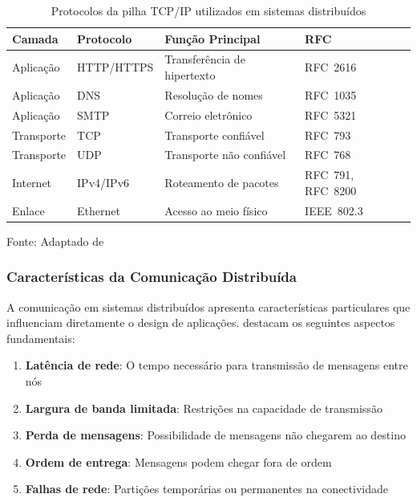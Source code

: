 \begin{table}[H]
\centering
\caption{Protocolos da pilha TCP/IP utilizados em sistemas distribuídos}
\begin{tabular}{|l|l|l|l|}
\hline
\textbf{Camada} & \textbf{Protocolo} & \textbf{Função Principal} & \textbf{RFC} \\
\hline
Aplicação & HTTP/HTTPS & Transferência de hipertexto & RFC~2616 \\
\hline
Aplicação & DNS & Resolução de nomes & RFC~1035 \\
\hline
Aplicação & SMTP & Correio eletrônico & RFC~5321 \\
\hline
Transporte & TCP & Transporte confiável & RFC~793 \\
\hline
Transporte & UDP & Transporte não confiável & RFC~768 \\
\hline
Internet & IPv4/IPv6 & Roteamento de pacotes & RFC~791, RFC~8200 \\
\hline
Enlace & Ethernet & Acesso ao meio físico & IEEE~802.3 \\
\hline
\end{tabular}
\label{tab:protocolos_tcpip}
{\fontsize{10pt}{\baselineskip}\selectfont
Fonte: Adaptado de }
\end{table}

\subsubsection{Características da Comunicação Distribuída}

A comunicação em sistemas distribuídos apresenta características particulares que influenciam diretamente o design de aplicações.  destacam os seguintes aspectos fundamentais:

\begin{enumerate}
    \item \textbf{Latência de rede}: O tempo necessário para transmissão de mensagens entre nós
    \item \textbf{Largura de banda limitada}: Restrições na capacidade de transmissão
    \item \textbf{Perda de mensagens}: Possibilidade de mensagens não chegarem ao destino
    \item \textbf{Ordem de entrega}: Mensagens podem chegar fora de ordem
    \item \textbf{Falhas de rede}: Partições temporárias ou permanentes na conectividade
\end{enumerate}

